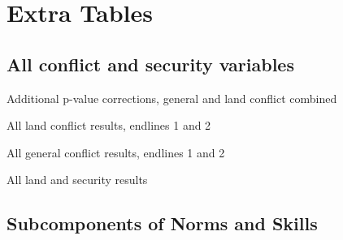 \documentclass[10pt]{article}
\begin{document}
\section{Extra Tables}
\clearpage
\setcounter{table}{0}   
\renewcommand{\thetable}{E.\arabic{table}}

\subsection{All conflict and security variables}

\begin{table}[H]
\caption{Additional p-value corrections, general and land conflict combined}
\label{conflict_adj_p_year}
\begin{center}
\begin{adjustbox}{max width = \textwidth}

\end{adjustbox}
\end{center}
\end{table}


\begin{table}[H]
\caption{All land conflict results, endlines 1 and 2}
\begin{center}
\begin{adjustbox}{max width = \textwidth}

\end{adjustbox}
\end{center}
\end{table}

\begin{table}[H]
\caption{All general conflict results, endlines 1 and 2}
\begin{center}
\begin{adjustbox}{max width = \textwidth}

\end{adjustbox}
\end{center}
\end{table}

\begin{table}[H]
\caption{All land and security results}
\begin{center}
\begin{adjustbox}{max width = \textwidth}

\end{adjustbox}
\end{center}
\end{table}



\subsection{Subcomponents of Norms and Skills}
\end{document}
